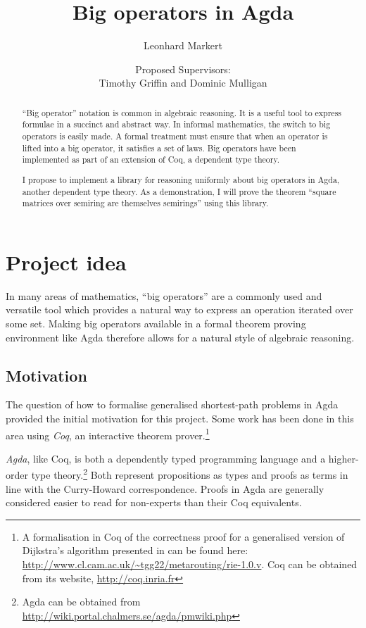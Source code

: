 \documentclass[a4paper]{scrartcl}
\title{Big operators in Agda}
\author{Leonhard Markert}
\date{Proposed Supervisors:\\Timothy Griffin and Dominic Mulligan}
\begin{document}
\maketitle

\begin{abstract}
\enquote{Big operator} notation is common in algebraic reasoning.
It is a useful tool to express formulae in a succinct and abstract way.
In informal mathematics, the switch to big operators is easily made.
A formal treatment must ensure that when an operator is lifted into a big operator, it satisfies a set of laws.
Big operators have been implemented as part of an extension of Coq, a dependent type theory.

I propose to implement a library for reasoning uniformly about big operators in Agda, another dependent type theory.
As a demonstration, I will prove the theorem \enquote{square matrices over semiring are themselves semirings} using this library.
\end{abstract}

\section{Project idea}

In many areas of mathematics, \enquote{big operators} are a commonly used and versatile tool which provides a natural way to express an operation iterated over some set. Making big operators available in a formal theorem proving environment like Agda therefore allows for a natural style of algebraic reasoning.

\subsection{Motivation}

The question of how to formalise generalised shortest-path problems in Agda provided the initial motivation for this project.
Some work has been done in this area using \emph{Coq}, an interactive theorem prover.\footnote{A formalisation in Coq of the correctness proof for a generalised version of Dijkstra's algorithm presented in \autocite{sobrinho_routing_2010} can be found here: \url{http://www.cl.cam.ac.uk/~tgg22/metarouting/rie-1.0.v}. Coq can be obtained from its website, \url{http://coq.inria.fr}}

\emph{Agda}, like Coq, is both a dependently typed programming language and a higher-order type theory.\footnote{Agda can be obtained from \url{http://wiki.portal.chalmers.se/agda/pmwiki.php}} Both represent propositions as types and proofs as terms in line with the Curry-Howard correspondence.
Proofs in Agda are generally considered easier to read for non-experts than their Coq equivalents.
\end{document}
